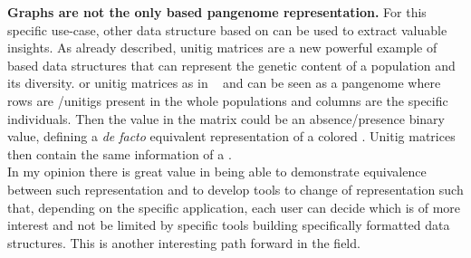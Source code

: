 \textbf{Graphs are not the only \kmer based pangenome representation.}
For this specific use-case, other data structure based on \kmers can be used to extract valuable insights. 
As already described, unitig matrices are a new powerful example of \kmer based data structures that can represent the genetic content of a population and its diversity. 
\kmer or unitig matrices as in \kmtricks~\cite{kmtricks} and \muset  can be seen as a pangenome where rows are \kmers/unitigs present in the whole populations and columns are the specific individuals. Then the value in the matrix could be an absence/presence binary value, defining a \emph{de facto} equivalent representation of a colored \dbg. Unitig matrices then contain the same information of a \ccdbg. \\
In my opinion there is great value in being able to demonstrate equivalence between such representation and to develop tools to change of representation such that, depending on the specific application, each user can decide which is of more interest and not be limited by specific tools building specifically formatted data structures. This is another interesting path forward in the field.

